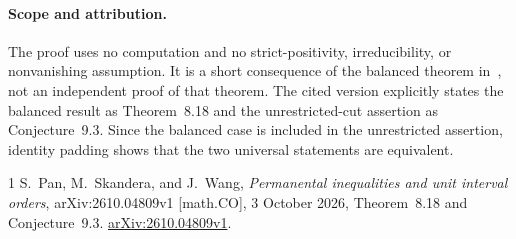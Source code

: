 \documentclass[11pt]{article}
\begin{document}
\paragraph{Scope and attribution.}
The proof uses no computation and no strict-positivity, irreducibility, or nonvanishing assumption. It is a short consequence of the balanced theorem in~\cite{PSW}, not an independent proof of that theorem. The cited version explicitly states the balanced result as Theorem~8.18 and the unrestricted-cut assertion as Conjecture~9.3. Since the balanced case is included in the unrestricted assertion, identity padding shows that the two universal statements are equivalent.

\begin{thebibliography}{1}
S.~Pan, M.~Skandera, and J.~Wang,
\emph{Permanental inequalities and unit interval orders},
arXiv:2610.04809v1 [math.CO], 3 October 2026,
Theorem~8.18 and Conjecture~9.3.
\href{https://arxiv.org/abs/2610.04809v1}{arXiv:2610.04809v1}.
\end{thebibliography}
\end{document}
